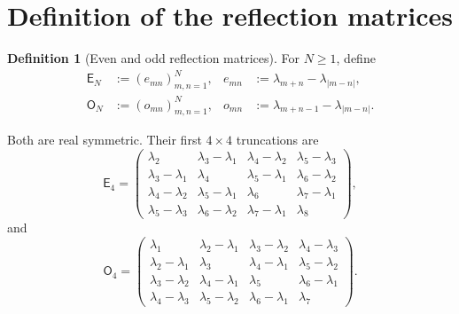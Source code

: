 \documentclass[preprint,12pt]{elsarticle}
\numberwithin{equation}{section}
\theoremstyle{plain}
\theoremstyle{definition}
\newtheorem{definition}[theorem]{Definition}
\theoremstyle{remark}
\newcommand{\E}{\mathsf E}
\newcommand{\Omat}{\mathsf O}
\begin{document}
\section{Definition of the reflection matrices}
\label{sec:definitions}

\begin{definition}[Even and odd reflection matrices]
\label{def:reflection_matrices}
For $N\ge1$, define
\begin{align}
\E_N
&:=\left(e_{mn}\right)_{m,n=1}^N,
&
e_{mn}&:=\lambda_{m+n}-\lambda_{|m-n|},
\label{eq:E_definition}\\
\Omat_N
&:=\left(o_{mn}\right)_{m,n=1}^N,
&
o_{mn}&:=\lambda_{m+n-1}-\lambda_{|m-n|}.
\label{eq:O_definition}
\end{align}
\end{definition}

Both are real symmetric. Their first $4\times4$ truncations are
\begin{equation}
\E_4=
\begin{pmatrix}
\lambda_2&\lambda_3-\lambda_1&\lambda_4-\lambda_2&\lambda_5-\lambda_3\\
\lambda_3-\lambda_1&\lambda_4&\lambda_5-\lambda_1&\lambda_6-\lambda_2\\
\lambda_4-\lambda_2&\lambda_5-\lambda_1&\lambda_6&\lambda_7-\lambda_1\\
\lambda_5-\lambda_3&\lambda_6-\lambda_2&\lambda_7-\lambda_1&\lambda_8
\end{pmatrix},
\label{eq:E4}
\end{equation}
and
\begin{equation}
\Omat_4=
\begin{pmatrix}
\lambda_1&\lambda_2-\lambda_1&\lambda_3-\lambda_2&\lambda_4-\lambda_3\\
\lambda_2-\lambda_1&\lambda_3&\lambda_4-\lambda_1&\lambda_5-\lambda_2\\
\lambda_3-\lambda_2&\lambda_4-\lambda_1&\lambda_5&\lambda_6-\lambda_1\\
\lambda_4-\lambda_3&\lambda_5-\lambda_2&\lambda_6-\lambda_1&\lambda_7
\end{pmatrix}.
\label{eq:O4}
\end{equation}
\end{document}
